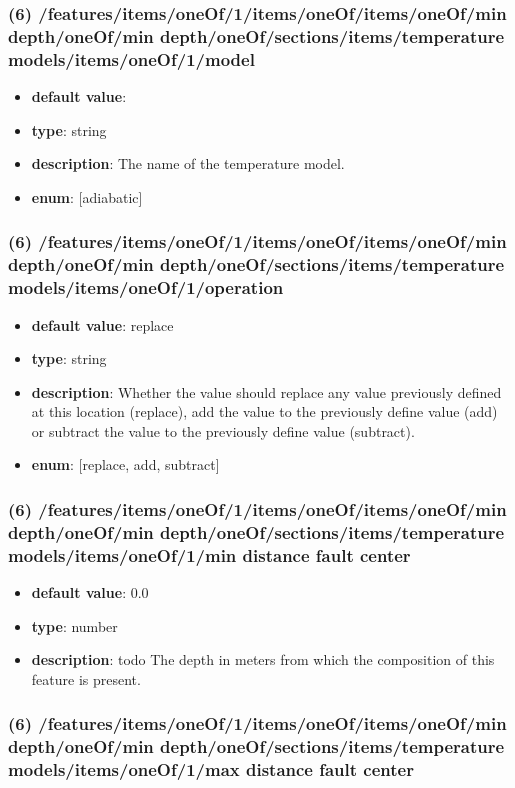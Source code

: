 \subsubsection{(6) /features/items/oneOf/1/items/oneOf/items/oneOf/min depth/oneOf/min depth/oneOf/sections/items/temperature models/items/oneOf/1/model}
\begin{itemize}[leftmargin=6em]\item {\bf default value}: 
\item {\bf type}: string
\item {\bf description}: The name of the temperature model.
\item {\bf enum}: [adiabatic]\end{itemize}\subsubsection{(6) /features/items/oneOf/1/items/oneOf/items/oneOf/min depth/oneOf/min depth/oneOf/sections/items/temperature models/items/oneOf/1/operation}
\begin{itemize}[leftmargin=6em]\item {\bf default value}: replace
\item {\bf type}: string
\item {\bf description}: Whether the value should replace any value previously defined at this location (replace), add the value to the previously define value (add) or subtract the value to the previously define value (subtract).
\item {\bf enum}: [replace, add, subtract]\end{itemize}\subsubsection{(6) /features/items/oneOf/1/items/oneOf/items/oneOf/min depth/oneOf/min depth/oneOf/sections/items/temperature models/items/oneOf/1/min distance fault center}
\begin{itemize}[leftmargin=6em]\item {\bf default value}: 0.0
\item {\bf type}: number
\item {\bf description}: todo The depth in meters from which the composition of this feature is present.
\end{itemize}\subsubsection{(6) /features/items/oneOf/1/items/oneOf/items/oneOf/min depth/oneOf/min depth/oneOf/sections/items/temperature models/items/oneOf/1/max distance fault center}
